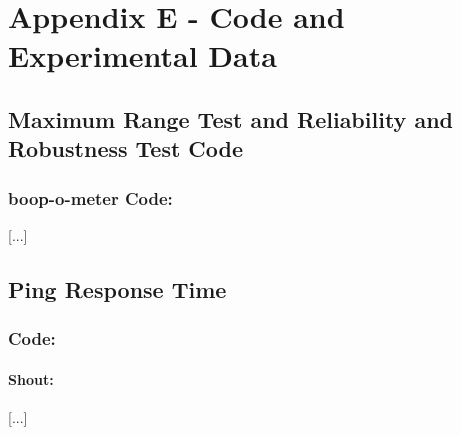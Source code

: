 \cleardoublepage%
\chapter*{\label{chap:apx_e}Appendix E - Code and Experimental Data}%
%

\section*{Maximum Range Test and Reliability and Robustness Test Code}
\subsection*{boop-o-meter Code:}
[...]
%



\section*{Ping Response Time}
\subsection*{Code:}
\subsubsection*{Shout:}
[...]
%
